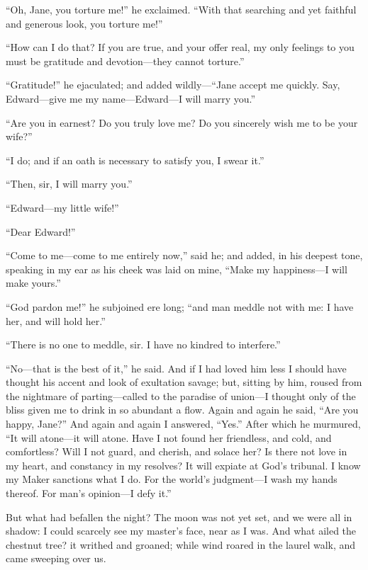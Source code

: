 \enquote{Oh, Jane, you torture me!} he exclaimed. \enquote{With that
searching and yet faithful and generous look, you torture me!}

\enquote{How can I do that? If you are true, and your offer real, my
only feelings to you must be gratitude and devotion---they cannot
torture.}

\enquote{Gratitude!} he ejaculated; and added wildly---\enquote{Jane
accept me quickly. Say, Edward---give me my name---Edward---I will
marry you.}

\enquote{Are you in earnest? Do you truly love me? Do you sincerely
wish me to be your wife?}

\enquote{I do; and if an oath is necessary to satisfy you, I swear it.}

\enquote{Then, sir, I will marry you.}

\enquote{Edward---my little wife!}

\enquote{Dear Edward!}

\enquote{Come to me---come to me entirely now,} said he; and added, in
his deepest tone, speaking in my ear as his cheek was laid on mine,
\enquote{Make my happiness---I will make yours.}

\enquote{God pardon me!} he subjoined ere long; \enquote{and man meddle
not with me: I have her, and will hold her.}

\enquote{There is no one to meddle, sir. I have no kindred to
interfere.}

\enquote{No---that is the best of it,} he said. And if I had loved him
less I should have thought his accent and look of exultation savage;
but, sitting by him, roused from the nightmare of parting---called to
the paradise of union---I thought only of the bliss given me to drink in
so abundant a flow. Again and again he said, \enquote{Are you happy,
Jane?} And again and again I answered, \enquote{Yes.} After which he
murmured, \enquote{It will atone---it will atone. Have I not found her
friendless, and cold, and comfortless? Will I not guard, and cherish,
and solace her? Is there not love in my heart, and constancy in my
resolves? It will expiate at God's tribunal. I know my Maker sanctions
what I do. For the world's judgment---I wash my hands thereof. For
man's opinion---I defy it.}

But what had befallen the night? The moon was not yet set, and we were
all in shadow: I could scarcely see my master's face, near as I was. 
And what ailed the chestnut tree? it writhed and groaned; while wind
roared in the laurel walk, and came sweeping over us.

